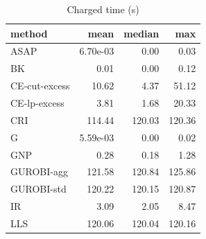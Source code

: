 \begin{table}[htbp]
\centering
\small
\caption{Charged time (s)}
\label{tab:E6_scalability_b120_time}
\begin{tabular}{lrrr}
\toprule
method & mean & median & max \\
\midrule
ASAP & 6.70e-03 & 0.00 & 0.03 \\
BK & 0.01 & 0.00 & 0.12 \\
CE-cut-excess & 10.62 & 4.37 & 51.12 \\
CE-lp-excess & 3.81 & 1.68 & 20.33 \\
CRI & 114.44 & 120.03 & 120.36 \\
G & 5.59e-03 & 0.00 & 0.02 \\
GNP & 0.28 & 0.18 & 1.28 \\
GUROBI-agg & 121.58 & 120.84 & 125.86 \\
GUROBI-std & 120.22 & 120.15 & 120.87 \\
IR & 3.09 & 2.05 & 8.47 \\
LLS & 120.06 & 120.04 & 120.16 \\
\bottomrule
\end{tabular}
\end{table}
